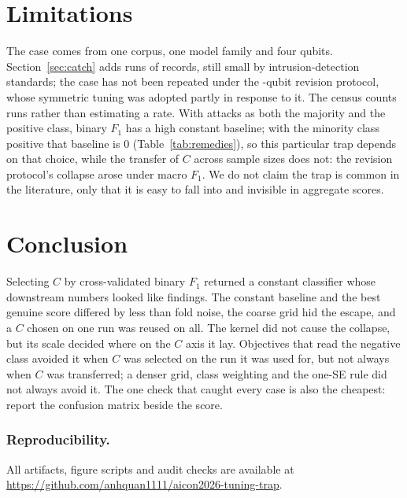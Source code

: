 \documentclass[runningheads]{llncs}
\newcommand{\Fone}{F_1}
\begin{document}
\section{Limitations}\label{sec:limits}

The case comes from one corpus, one model family and four qubits.
Section~\ref{sec:catch} adds runs of \pnLarge{} records, still small by
intrusion-detection standards; the case has not been repeated under the
\prevQubits-qubit revision protocol, whose symmetric tuning was adopted partly
in response to it. The census counts runs rather than estimating a rate. With
attacks as both the majority and the positive class, binary $\Fone$ has a
high constant baseline; with the minority class positive that baseline is $0$
(Table~\ref{tab:remedies}), so this particular trap depends on that choice,
while the transfer of $C$ across sample sizes does not: the revision
protocol's collapse arose under macro $\Fone$. We
do not claim the trap is common in the literature, only that it is easy to
fall into and invisible in aggregate scores.

\section{Conclusion}\label{sec:conclusion}

Selecting $C$ by cross-validated binary $\Fone$ returned a constant
classifier whose downstream numbers looked like findings. The constant baseline
and the best genuine score differed by less than fold noise, the coarse grid
hid the escape, and a $C$ chosen on one run was reused on all. The kernel did
not cause the collapse, but its scale decided where on the $C$ axis it lay.
Objectives that read the negative class avoided it when $C$ was selected on
the run it was used for, but not always when $C$ was transferred; a denser grid,
class weighting and the one-SE rule did not always avoid it. The one
check that caught every case is also the cheapest: report the confusion
matrix beside the score.

\subsubsection*{Reproducibility.}

  All artifacts, figure scripts and audit checks are available at
  \url{https://github.com/anhquan1111/aicon2026-tuning-trap}.
\end{document}
